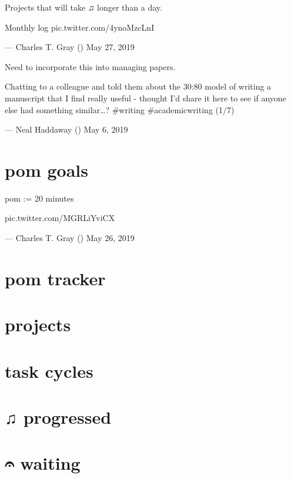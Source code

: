 \documentclass[]{book}
\begin{document}
Projects that will take ♫ longer than a day.

Monthly log pic.twitter.com/4ynoMzcLnI

--- Charles T. Gray (\citet{cantabile}) May 27, 2019

Need to incorporate this into managing papers.

Chatting to a colleague and told them about the 30:80 model of writing a manuscript that I find really useful - thought I'd share it here to see if anyone else had something similar\ldots{}? \#writing \#academicwriting (1/7)

--- Neal Haddaway (\citet{nealhaddaway}) May 6, 2019

\hypertarget{dayview:goals}{%
\section{pom goals}\label{dayview:goals}}

pom := 20 minutes

pic.twitter.com/MGRLiYviCX

--- Charles T. Gray (\citet{cantabile}) May 26, 2019

\hypertarget{dayview:pom-tracker}{%
\section{pom tracker}\label{dayview:pom-tracker}}

\hypertarget{dayview:projects}{%
\section{projects}\label{dayview:projects}}

\hypertarget{dayview:task-cycles}{%
\section{task cycles}\label{dayview:task-cycles}}

\hypertarget{dayview:progressed}{%
\section{♫ progressed}\label{dayview:progressed}}

\hypertarget{dayview:waiting}{%
\section{𝄐 waiting}\label{dayview:waiting}}
\end{document}
